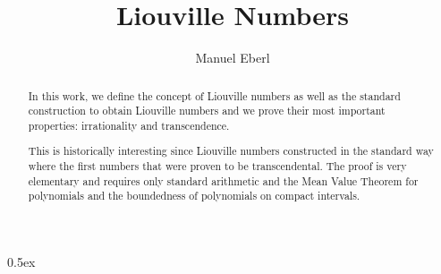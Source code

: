 \documentclass[11pt,a4paper]{article}
\begin{document}
\title{Liouville Numbers}
\author{Manuel Eberl}
\maketitle

\begin{abstract}
In this work, we define the concept of Liouville numbers as well as the standard construction to obtain Liouville numbers and we prove their most important properties: irrationality and transcendence.

This is historically interesting since Liouville numbers constructed in the standard way where the first numbers that were proven to be transcendental. The proof is very elementary and requires only standard arithmetic and the Mean Value Theorem for polynomials and the boundedness of polynomials on compact intervals.
\end{abstract}

\tableofcontents

\parindent 0pt\parskip 0.5ex





\end{document}
